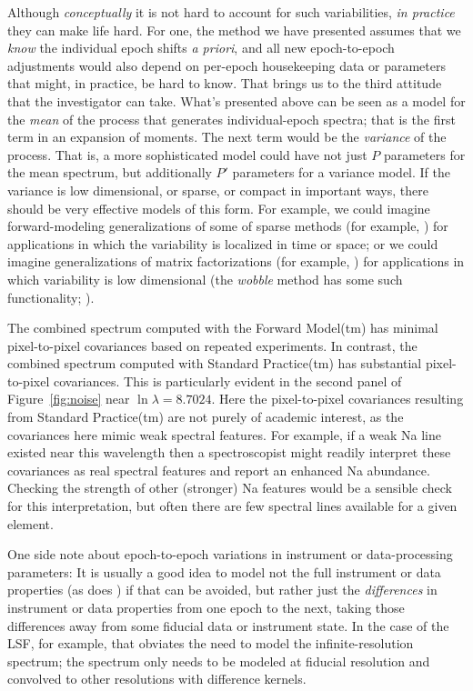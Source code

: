 \documentclass[modern]{aastex631}
\begin{document}
Although \emph{conceptually} it is not hard to account for such variabilities, \emph{in practice} they can make life hard.
For one, the method we have presented assumes that we \emph{know} the individual epoch shifts \textsl{a priori}, and all new epoch-to-epoch adjustments would also depend on per-epoch housekeeping data or parameters that might, in practice, be hard to know.
That brings us to the third attitude that the investigator can take.
What's presented above can be seen as a model for the \emph{mean} of the process that generates individual-epoch spectra; that is the first term in an expansion of moments.
The next term would be the \emph{variance} of the process.
That is, a more sophisticated model could have not just $P$ parameters for the mean spectrum, but additionally $P'$ parameters for a variance model.
If the variance is low dimensional, or sparse, or compact in important ways, there should be very effective models of this form.
For example, we could imagine forward-modeling generalizations of some of sparse methods (for example, \citealt{candes}) for applications in which the variability is localized in time or space; or we could imagine generalizations of matrix factorizations (for example, \citealt{hmf}) for applications in which variability is low dimensional (the \textsl{wobble} method has some such functionality; \citealt{wobble}).

The combined spectrum computed with the Forward Model(tm) has minimal pixel-to-pixel covariances based on repeated experiments.
In contrast, the combined spectrum computed with Standard Practice(tm) has substantial pixel-to-pixel covariances.
This is particularly evident in the second panel of Figure~\ref{fig:noise} near $\ln\lambda = 8.7024$.
Here the pixel-to-pixel covariances resulting from Standard Practice(tm) are not purely of academic interest, as the covariances here mimic weak spectral features.
For example, if a weak Na line existed near this wavelength then a spectroscopist might readily interpret these covariances as real spectral features and report an enhanced Na abundance.
Checking the strength of other (stronger) Na features would be a sensible check for this interpretation, but often there are few spectral lines available for a given element.

One side note about epoch-to-epoch variations in instrument or data-processing parameters:
It is usually a good idea to model not the full instrument or data properties (as does \citealt{sp}) if that can be avoided, but rather just the \emph{differences} in instrument or data properties from one epoch to the next, taking those differences away from some fiducial data or instrument state.
In the case of the LSF, for example, that obviates the need to model the infinite-resolution spectrum; the spectrum only needs to be modeled at fiducial resolution and convolved to other resolutions with difference kernels.
\end{document}
